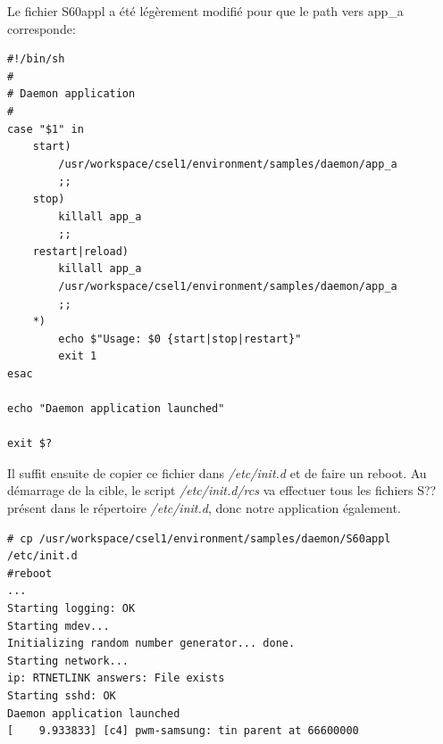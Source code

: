 Le fichier S60appl a été légèrement modifié pour que le path vers app\_a corresponde:
\begin{lstlisting}
#!/bin/sh
#
# Daemon application
#
case "$1" in
	start)
		/usr/workspace/csel1/environment/samples/daemon/app_a
		;;
	stop)
		killall app_a
		;;
	restart|reload)
		killall app_a
		/usr/workspace/csel1/environment/samples/daemon/app_a
		;;
	*)
		echo $"Usage: $0 {start|stop|restart}"
		exit 1
esac

echo "Daemon application launched"

exit $?
\end{lstlisting}
Il suffit ensuite de copier ce fichier dans \textit{/etc/init.d} et de faire un reboot. Au démarrage de la cible, le script \textit{/etc/init.d/rcs} va effectuer tous les fichiers S?? présent dans le répertoire \textit{/etc/init.d}, donc notre application également.
\begin{lstlisting}
# cp /usr/workspace/csel1/environment/samples/daemon/S60appl /etc/init.d
#reboot
...
Starting logging: OK                                                            
Starting mdev...                                                                
Initializing random number generator... done.                                   
Starting network...                                                             
ip: RTNETLINK answers: File exists                                              
Starting sshd: OK                                                               
Daemon application launched                                                     
[    9.933833] [c4] pwm-samsung: tin parent at 66600000  
\end{lstlisting}
\newpage

